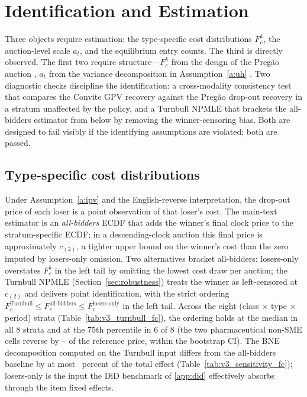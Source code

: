\section{Identification and Estimation}\label{sec:identification}

Three objects require estimation: the type-specific cost distributions $F_c^k$, the auction-level scale $a_t$, and the equilibrium entry counts. The third is directly observed. The first two require structure---$F_c^k$ from the design of the Preg\~ao auction \citep{haile2003}, $a_t$ from the variance decomposition in Assumption~\ref{a:uh} \citep{krasnokutskaya2011}. Two diagnostic checks discipline the identification: a cross-modality consistency test that compares the Convite GPV recovery against the Preg\~ao drop-out recovery in a stratum unaffected by the policy, and a Turnbull NPMLE that brackets the all-bidders estimator from below by removing the winner-censoring bias. Both are designed to fail visibly if the identifying assumptions are violated; both are passed.

\subsection{Type-specific cost distributions}

Under Assumption~\ref{a:ipv} and the English-reverse interpretation, the drop-out price of each loser is a point observation of that loser's cost. The main-text estimator is an \emph{all-bidders} ECDF that adds the winner's final clock price to the stratum-specific ECDF; in a descending-clock auction this final price is approximately $c_{(2)}$, a tighter upper bound on the winner's cost than the zero imputed by losers-only omission. Two alternatives bracket all-bidders: losers-only overstates $F_c^k$ in the left tail by omitting the lowest cost draw per auction; the Turnbull NPMLE (Section~\ref{sec:robustness}) treats the winner as left-censored at $c_{(2)}$ and delivers point identification, with the strict ordering $F_c^{\text{Turnbull}} \le F_c^{\text{all-bidders}} \le F_c^{\text{losers-only}}$ in the left tail. Across the eight (class $\times$ type $\times$ period) strata (Table~\ref{tab:v3_turnbull_fc}), the ordering holds at the median in all 8 strata and at the 75th percentile in 6 of 8 (the two pharmaceutical non-SME cells reverse by \turnGapLo--\turnGapHi{} of the reference price, within the bootstrap CI). The BNE decomposition computed on the Turnbull input differs from the all-bidders baseline by at most \turnbullDeviationPct~percent of the total effect (Table~\ref{tab:v3_sensitivity_fc}); losers-only is the input the DiD benchmark of \ref{app:did} effectively absorbs through the item fixed effects.

